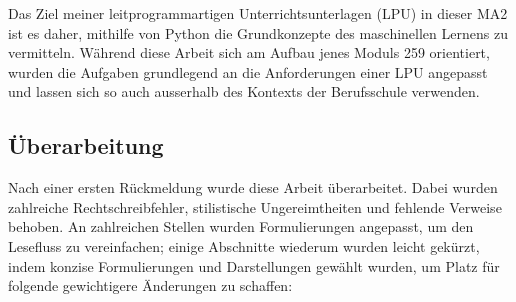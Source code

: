 \documentclass[twocolumn]{article}
\begin{document}
Das Ziel meiner leitprogrammartigen Unterrichtsunterlagen (LPU) in dieser MA2 ist es daher, mithilfe von Python die Grundkonzepte des maschinellen Lernens zu vermitteln. Während diese Arbeit sich am Aufbau jenes Moduls 259 orientiert, wurden die Aufgaben grundlegend an die Anforderungen einer LPU angepasst und lassen sich so auch ausserhalb des Kontexts der Berufsschule verwenden. 

\subsection{Überarbeitung}
Nach einer ersten Rückmeldung wurde diese Arbeit überarbeitet. Dabei wurden zahlreiche Rechtschreibfehler, stilistische Ungereimtheiten und fehlende Verweise behoben. An zahlreichen Stellen wurden Formulierungen angepasst, um den Lesefluss zu vereinfachen; einige Abschnitte wiederum wurden leicht gekürzt, indem konzise Formulierungen und Darstellungen gewählt wurden, um Platz für folgende gewichtigere Änderungen zu schaffen:
\end{document}
